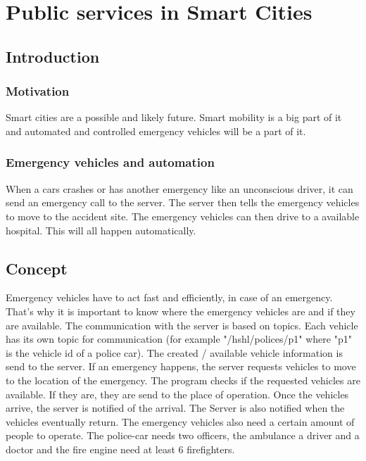 \chapter{Public services in Smart Cities}
\label{intro} 



\section{Introduction}
\label{sec:1}
\subsection{Motivation}
Smart cities are a possible and likely future. Smart mobility is a big part of it and automated and controlled emergency vehicles will be a part of it. 
\subsection{Emergency vehicles and automation}
When a cars crashes or has another emergency like an unconscious driver, it can send an emergency call to the server. The server then tells the emergency vehicles to move to the accident site. The emergency vehicles can then drive to a available hospital. This will all happen automatically.

\section{Concept}
\label{sec:3}
Emergency vehicles have to act fast and efficiently, in case of an emergency. That's why it is important to know where the emergency vehicles are and if they are available.
\newline
The communication with the server is based on topics. Each vehicle has its own topic for communication (for example "/hshl/polices/p1" where "p1" is the vehicle id of a police car).  The created / available vehicle information is send to the server. If an emergency happens, the server requests vehicles to move to the location of the emergency. The program checks if the requested vehicles are available. If they are, they are send to the place of operation. Once the vehicles arrive, the server is notified of the arrival. The Server is also notified when the vehicles eventually return. 
\newline
The emergency vehicles also need a certain amount of people to operate. The police-car needs two officers, the ambulance a driver and a doctor and the fire engine need at least 6 firefighters.
\newline
